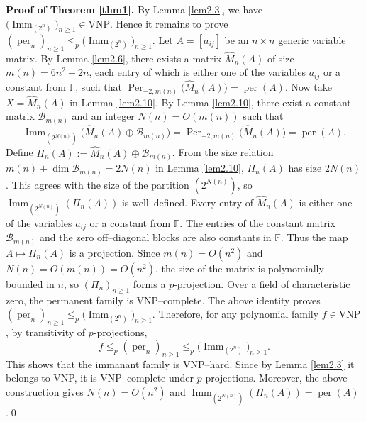 \documentclass[11pt,a4paper]{article}
\begin{document}
\textbf{Proof of Theorem \ref{thm1}.}
By Lemma \ref{lem2.3}, we have $\bigl(\operatorname{Imm}_{(2^n)}\bigr)_{n\geq1}\in\mathrm{VNP}$. Hence it remains to prove
$(\operatorname{per}_n)_{n\geq1}\leq_p\bigl(\operatorname{Imm}_{(2^n)}\bigr)_{n\geq1}$.
Let $A=[a_{ij}]$ be an $n\times n$ generic variable matrix. By Lemma \ref{lem2.6}, there exists a matrix $\widehat M_n(A)$ of size $m(n)=6n^2+2n$, each entry of which is either one of the variables $a_{ij}$ or a constant from $\mathbb{F}$, such that $\operatorname{Per}_{-2,m(n)}\bigl(\widehat M_n(A)\bigr)=\operatorname{per}(A)$.
Now take $X=\widehat M_n(A)$ in Lemma \ref{lem2.10}. By Lemma \ref{lem2.10}, there exist a constant matrix $\mathcal B_{m(n)}$ and an integer $N(n)=O(m(n))$ such that
\[
  \operatorname{Imm}_{(2^{N(n)})}
  \bigl(\widehat M_n(A)\oplus\mathcal B_{m(n)}\bigr)
  =\operatorname{Per}_{-2,m(n)}\bigl(\widehat M_n(A)\bigr)
  =\operatorname{per}(A).
\]
Define $\Pi_n(A):=\widehat M_n(A)\oplus\mathcal B_{m(n)}$.
From the size relation $m(n)+\dim\mathcal B_{m(n)}=2N(n)$ in Lemma \ref{lem2.10}, $\Pi_n(A)$ has size $2N(n)$. This agrees with the size of the partition $(2^{N(n)})$, so $\operatorname{Imm}_{(2^{N(n)})}(\Pi_n(A))$ is well–defined. Every entry of $\widehat M_n(A)$ is either one of the variables $a_{ij}$ or a constant from $\mathbb{F}$. The entries of the constant matrix $\mathcal B_{m(n)}$ and the zero off–diagonal blocks are also constants in $\mathbb{F}$. Thus the map $A\mapsto\Pi_n(A)$ is a projection. Since $m(n)=O(n^2)$ and $N(n)=O(m(n))=O(n^2)$, the size of the matrix is polynomially bounded in $n$, so $(\Pi_n)_{n\geq1}$ forms a $p$-projection.
Over a field of characteristic zero, the permanent family is VNP–complete. The above identity proves
$(\operatorname{per}_n)_{n\geq1}\leq_p
  \bigl(\operatorname{Imm}_{(2^n)}\bigr)_{n\geq1}$.
Therefore, for any polynomial family $f\in\mathrm{VNP}$, by transitivity of $p$-projections,
\[
  f\leq_p(\operatorname{per}_n)_{n\geq1}\leq_p
  \bigl(\operatorname{Imm}_{(2^n)}\bigr)_{n\geq1}.
\]
This shows that the immanant family is VNP–hard. Since by Lemma \ref{lem2.3} it belongs to VNP, it is VNP–complete under $p$-projections. Moreover, the above construction gives $N(n)=O(n^2)$ and
$\operatorname{Imm}_{(2^{N(n)})}(\Pi_n(A))=\operatorname{per}(A)$.\qed
\end{document}
